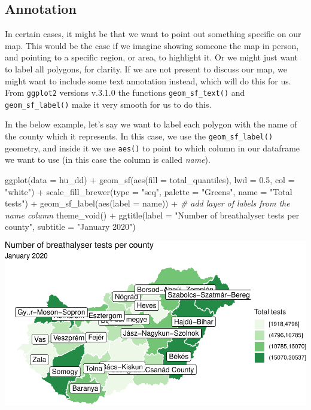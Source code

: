 \documentclass[
]{book}
\makeatletter
\newenvironment{Shaded}{\begin{snugshade}}{\end{snugshade}}
\newcommand{\AttributeTok}[1]{\textcolor[rgb]{0.61,0.61,0.61}{#1}}
\newcommand{\CommentTok}[1]{\textcolor[rgb]{0.37,0.37,0.37}{\textit{#1}}}
\newcommand{\FloatTok}[1]{\textcolor[rgb]{0.06,0.06,0.06}{#1}}
\newcommand{\FunctionTok}[1]{\textcolor[rgb]{0,0,0}{#1}}
\newcommand{\NormalTok}[1]{#1}
\newcommand{\SpecialCharTok}[1]{\textcolor[rgb]{0,0,0}{#1}}
\newcommand{\StringTok}[1]{\textcolor[rgb]{0.5,0.5,0.5}{#1}}
\newenvironment{kframe}{%
\medskip{}
\setlength{\fboxsep}{.8em}
 \def\at@end@of@kframe{}%
 \ifinner\ifhmode%
  \def\at@end@of@kframe{\end{minipage}}%
  \begin{minipage}{\columnwidth}%
 \fi\fi%
 \def\FrameCommand##1{\hskip\@totalleftmargin \hskip-\fboxsep
 \colorbox{shadecolor}{##1}\hskip-\fboxsep
     \hskip-\linewidth \hskip-\@totalleftmargin \hskip\columnwidth}%
 \MakeFramed {\advance\hsize-\width
   \@totalleftmargin\z@ \linewidth\hsize
   \@setminipage}}%
 {\par\unskip\endMakeFramed%
 \at@end@of@kframe}
\renewenvironment{Shaded}{\begin{kframe}}{\end{kframe}}
\makeatother
\begin{document}
\hypertarget{annotation}{%
\subsection{Annotation}\label{annotation}}

In certain cases, it might be that we want to point out something specific on our map. This would be the case if we imagine showing someone the map in person, and pointing to a specific region, or area, to highlight it. Or we might just want to label all polygons, for clarity. If we are not present to discuss our map, we might want to include some text annotation instead, which will do this for us. From \texttt{ggplot2} versions v.3.1.0 the functions \texttt{geom\_sf\_text()} and \texttt{geom\_sf\_label()} make it very smooth for us to do this.

In the below example, let's say we want to label each polygon with the name of the county which it represents. In this case, we use the \texttt{geom\_sf\_label()} geometry, and inside it we use \texttt{aes()} to point to which column in our dataframe we want to use (in this case the column is called \emph{name}).

\begin{Shaded}
\begin{Highlighting}[]
\FunctionTok{ggplot}\NormalTok{(}\AttributeTok{data =}\NormalTok{ hu\_dd) }\SpecialCharTok{+} 
  \FunctionTok{geom\_sf}\NormalTok{(}\FunctionTok{aes}\NormalTok{(}\AttributeTok{fill =}\NormalTok{ total\_quantiles), }
          \AttributeTok{lwd =} \FloatTok{0.5}\NormalTok{, }\AttributeTok{col =} \StringTok{"white"}\NormalTok{) }\SpecialCharTok{+} 
  \FunctionTok{scale\_fill\_brewer}\NormalTok{(}\AttributeTok{type =} \StringTok{"seq"}\NormalTok{, }
                    \AttributeTok{palette =} \StringTok{"Greens"}\NormalTok{, }
                    \AttributeTok{name =} \StringTok{"Total tests"}\NormalTok{) }\SpecialCharTok{+} 
  \FunctionTok{geom\_sf\_label}\NormalTok{(}\FunctionTok{aes}\NormalTok{(}\AttributeTok{label =}\NormalTok{ name)) }\SpecialCharTok{+}  \CommentTok{\# add layer of labels from the name column}
  \FunctionTok{theme\_void}\NormalTok{() }\SpecialCharTok{+} 
  \FunctionTok{ggtitle}\NormalTok{(}\AttributeTok{label =} \StringTok{"Number of breathalyser tests per county"}\NormalTok{, }
          \AttributeTok{subtitle =} \StringTok{"January 2020"}\NormalTok{)}
\end{Highlighting}
\end{Shaded}

\includegraphics{crime_mapping_files/figure-latex/addcountynames-1.pdf}
\end{document}
